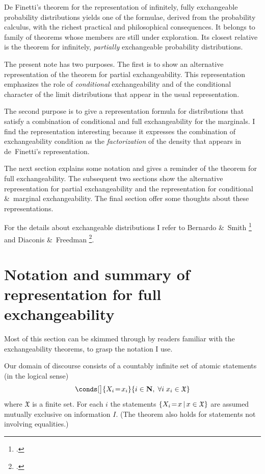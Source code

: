 \documentclass[\ifafour a4paper,12pt,\else a5paper,10pt,\fi%
onecolumn,oneside,article,%
british%
]{memoir}
\theoremstyle{remark}
\theoremstyle{innote}
\newcommand*{\citep}{\footcites}
\newcommand*{\amp}{\&}
\newcommand*{\NN}{\bm{\mathrm{N}}}
\DeclarePairedDelimiter\set{\{}{\}}
\renewcommand*{\|}[1][]{\nonscript\,#1\vert\nonscript\,\mathopen{}}
\newcommand*{\sects}{\S\S}%
\renewcommand*{\=}{\TextOrMath\texteq\eq}
\newcommand*{\X}[1]{X_{#1}}
\newcommand*{\x}[1]{x_{#1}}
\newcommand*{\sX}{\mathfrak{X}}
\begin{document}
De Finetti's theorem for the representation of infinitely, fully
exchangeable probability distributions yields one of the formulae, derived
from the probability calculus, with the richest practical and philosophical
consequences. It belongs to family of theorems whose members are still
under exploration. Its closest relative is the theorem for infinitely,
\emph{partially} exchangeable probability distributions.

The present note has two purposes. The first is to show an alternative
representation of the theorem for partial exchangeability. This
representation emphasizes the role of \emph{conditional} exchangeability
and of the conditional character of the limit distributions that appear in
the usual representation.

The second purpose is to give a representation formula for distributions
that satisfy a combination of conditional and full exchangeability for the
marginals. I find the representation interesting because it expresses the
combination of exchangeability condition as the \emph{factorization} of the
density that appears in de~Finetti's representation.



The next section explains some notation and gives a reminder of the theorem
for full exchangeability. The subsequent two sections show the alternative
representation for partial exchangeability and the representation for
conditional \amp\ marginal exchangeability. The final section offer some
thoughts about these representations.

For the details about exchangeable distributions I refer to Bernardo \amp\
Smith \citep[\sects~4.3, 4.6]{bernardoetal1994_r2000} and Diaconis \amp\
Freedman \citep{diaconisetal1980,diaconisetal1980b}.



\section{Notation and summary of representation for full exchangeability}
\label{sec:setup}

Most of this section can be skimmed through by readers familiar with the
exchangeability theorems, to grasp the notation I use.



Our domain of discourse consists of a countably infinite set of atomic
statements (in the logical sense)
 \begin{equation}
  \label{eq:statements}
  \conds[\big]{\X{i}\=\x{i}}{i \in \NN,\;
 \forall i\;\x{i} \in \sX}
\end{equation}
where $\sX$ is a finite set. For each $i$ the statements
$\set{\X{i}\=x \| x \in \sX}$ are assumed mutually exclusive on information
$I$. (The theorem also holds for statements not involving equalities.)
\end{document}
